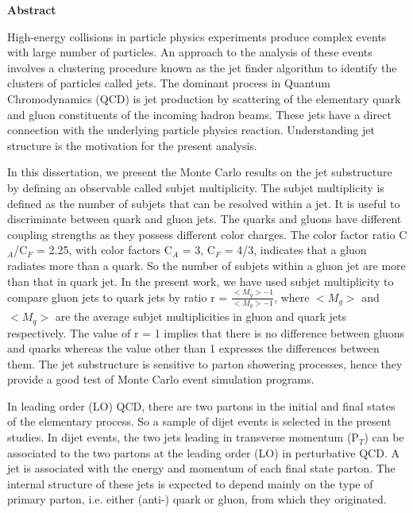 \begin{center}
{\bf \huge Abstract}
\end{center}

High-energy collisions in particle physics experiments produce complex events with large number of particles. An approach to the analysis of these events involves a clustering procedure known as the jet finder algorithm to identify the clusters of particles called jets. The dominant process in Quantum Chromodynamics (QCD) is jet production by scattering of the elementary quark and gluon constituents of the incoming hadron
beams. These jets have a direct connection with the underlying particle physics reaction. Understanding jet structure is the motivation for the present analysis.

In this dissertation, we present the Monte Carlo results on the jet substructure by defining an observable called subjet multiplicity. The subjet multiplicity is defined as the number of subjets that can be resolved within a jet. It is useful to discriminate between quark and gluon jets. The quarks and gluons have different coupling strengths as they possess different color charges. The color factor ratio C$_{A}$/C$_{F}$ = 2.25, with color factors C$_{A}$ = 3, C$_{F}$ = 4/3, indicates that a gluon radiates more than a quark. So the number of subjets within a gluon jet are more than that in quark jet. In the present work, we have used subjet multiplicity to compare  gluon jets to quark jets by ratio r = $\frac{<M_{g}> - 1}{<M_{q}> - 1}$, where $<M_{g}>$ and $<M_{q}>$ are the average subjet multiplicities in gluon and quark jets respectively. The value of r = 1 implies that there is no difference between gluons and quarks whereas the value other than 1 expresses the differences between them. The jet substructure is sensitive to parton showering processes, hence they provide a good test of Monte Carlo
event simulation programs.

In leading order (LO) QCD, there are two partons in the initial and final states
of the elementary process. So a sample of dijet events is selected in the present studies. 
In dijet events, the two jets leading in transverse momentum (P$_{T}$) can be
associated to the two partons at the leading order (LO)
in perturbative QCD. A jet is associated with the energy and momentum of each
final state parton. The internal structure of these jets
is expected to depend mainly on the type of primary parton,
i.e. either (anti-) quark or gluon, from which they
originated.

